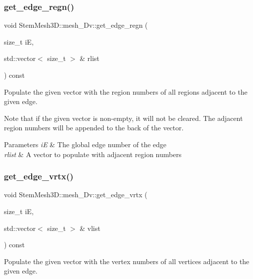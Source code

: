 \subsubsection{\texorpdfstring{get\+\_\+edge\+\_\+regn()}{get\_edge\_regn()}}
{\footnotesize\ttfamily void Stem\+Mesh3\+D\+::mesh\+\_\+Dv\+::get\+\_\+edge\+\_\+regn (\begin{DoxyParamCaption}\item[{size\+\_\+t}]{iE,  }\item[{std\+::vector$<$ size\+\_\+t $>$ \&}]{rlist }\end{DoxyParamCaption}) const}



Populate the given vector with the region numbers of all regions adjacent to the given edge. 

Note that if the given vector is non-\/empty, it will not be cleared. The adjacent region numbers will be appended to the back of the vector. 
\begin{DoxyParams}{Parameters}
{\em iE} & The global edge number of the edge \\
\hline
{\em rlist} & A vector to populate with adjacent region numbers \\
\hline
\end{DoxyParams}
\mbox{\label{classStemMesh3D_1_1mesh__3Dv_ab815cec3c06264372a7e57e01e1db380}} 
\subsubsection{\texorpdfstring{get\+\_\+edge\+\_\+vrtx()}{get\_edge\_vrtx()}}
{\footnotesize\ttfamily void Stem\+Mesh3\+D\+::mesh\+\_\+Dv\+::get\+\_\+edge\+\_\+vrtx (\begin{DoxyParamCaption}\item[{size\+\_\+t}]{iE,  }\item[{std\+::vector$<$ size\+\_\+t $>$ \&}]{vlist }\end{DoxyParamCaption}) const}



Populate the given vector with the vertex numbers of all vertices adjacent to the given edge. 

